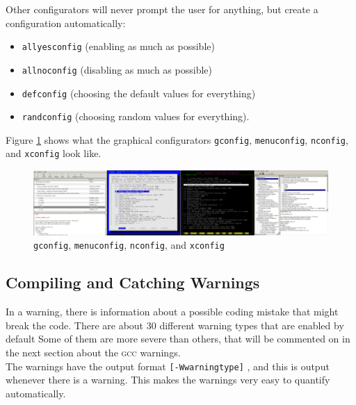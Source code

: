 \documentclass[a4paper,11pt]{report}
\newcommand{\textcode}[1]{
    \fboxsep=1pt
    \texttt{\colorbox{gray!20}{#1}}
}
\newcommand{\figa}{
    \begin{figure}[!htpb]
    \centering
}
\newcommand{\figb}[2]{
    \caption{#1}
    \label{#2}
    \end{figure}
}
\begin{document}
Other configurators will 
never prompt the user for anything, but create a configuration automatically: 
\begin{itemize}
    \item \texttt{allyesconfig} (enabling as much as possible) 
    \item \texttt{allnoconfig} (disabling as much as possible)
    \item \texttt{defconfig} (choosing the default values for everything)
    \item \texttt{randconfig} (choosing random values for everything).
\end{itemize}

Figure \ref{fig:lineofconfigs} shows what the graphical 
configurators \texttt{gconfig}, \texttt{menuconfig}, \texttt{nconfig}, and 
\texttt{xconfig} look like.
\\


\figa
    \includegraphics[scale=0.25]{pngs/configs50percent.png}
\figb{\texttt{gconfig}, \texttt{menuconfig}, \texttt{nconfig}, and 
    \texttt{xconfig}}{fig:lineofconfigs}

        \subsection{Compiling and Catching Warnings}
In a warning, there is information about a possible coding mistake that might 
break the code. There are about 30 different warning types that are enabled by 
default \cite{gccwarnings} Some of them are more severe than others, that will 
be commented on in the next section about the \textsc{gcc} warnings.
\\

The warnings have the output format \textcode{[-Wwarningtype]}, and this is 
output whenever there is a warning. This makes the warnings very easy to 
quantify automatically.

\end{document}
